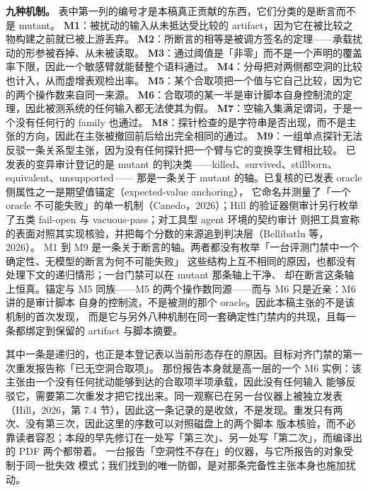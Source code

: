 \documentclass[UTF8,11pt]{ctexart}
\begin{document}
\noindent\textbf{九种机制。} 表中第一列的编号才是本稿真正贡献的东西，它们分类的是断言而不是 mutant。
\textbf{M1}：被扰动的输入从未抵达受比较的 artifact，因为它在被比较之物构建之前就已被上游丢弃。
\textbf{M2}：所断言的相等是被调方签名的定理——承载扰动的形参被吞掉、从未被读取。
\textbf{M3}：通过阈值是「非零」而不是一个声明的覆盖率下限，因此一个敏感臂就能替整个语料通过。
\textbf{M4}：分母把对两侧都空洞的比较也计入，从而虚增表观检出率。
\textbf{M5}：某个合取项把一个值与它自己比较，因为它的两个操作数来自同一来源。
\textbf{M6}：合取项的某一半是审计脚本自身控制流的定理，因此被测系统的任何输入都无法使其为假。
\textbf{M7}：空输入集满足谓词，于是一个没有任何行的 family 也通过。
\textbf{M8}：探针检查的是字符串是否出现，而不是主张的方向，因此在主张被撤回前后给出完全相同的通过。
\textbf{M9}：一组单点探针无法反驳一条关系型主张，因为没有任何探针把一个臂与它的变换孪生臂相比较。
已发表的变异审计登记的是 mutant 的判决类——killed、survived、stillborn、equivalent、unsupported——
那是一条关于 mutant 的轴。已复核的已发表 oracle 侧属性之一是期望值锚定（expected-value anchoring），
它命名并测量了「一个 oracle 不可能失败」的单一机制（Canedo，2026）；Hill 的验证器侧审计另行枚举了五类 fail-open 与 vacuous-pass；对工具型 agent 环境的契约审计
则把工具宣称的表面对照其实现核验，并把每个分数的来源追到判决层（Bellibatlu 等，2026）。
M1 到 M9 是一条关于断言的轴。两者都没有枚举「一台评测门禁中一个确定性、无模型的断言为何不可能失败」
这些结构上互不相同的原因，也都没有处理下文的递归情形；一台门禁可以在 mutant 那条轴上干净、
却在断言这条轴上恒真。锚定与 M5 同族——M5 的两个操作数同源——而与 M6 只是近亲：M6 讲的是审计脚本
自身的控制流，不是被测的那个 oracle。因此本稿主张的不是该机制的首次发现，
而是它与另外八种机制在同一套确定性门禁内的共现，且每一条都绑定到保留的 artifact 与脚本摘要。

其中一条是递归的，也正是本登记表以当前形态存在的原因。目标对齐门禁的第一次重发报告称「已无空洞合取项」。
那份报告本身就是高一层的一个 M6 实例：该主张由一个没有任何扰动能够到达的合取项半项承载，因此没有任何输入
能够反驳它，需要第二次重发才把它找出来。同一观察已在另一台仪器上被独立发表（Hill，2026，第 7.4 节），因此这一条记录的是收敛，不是发现。重发只有两次、没有第三次，因此这里的序数可以对照磁盘上的两个脚本
版本核验，而不必靠读者容忍；本段的早先修订在一处写「第三次」、另一处写「第二次」，而编译出的 PDF 两个都带着。
一台报告「空洞性不存在」的仪器，与它所报告的对象受制于同一批失效
模式；我们找到的唯一防御，是对那条完备性主张本身也施加扰动。
\end{document}
